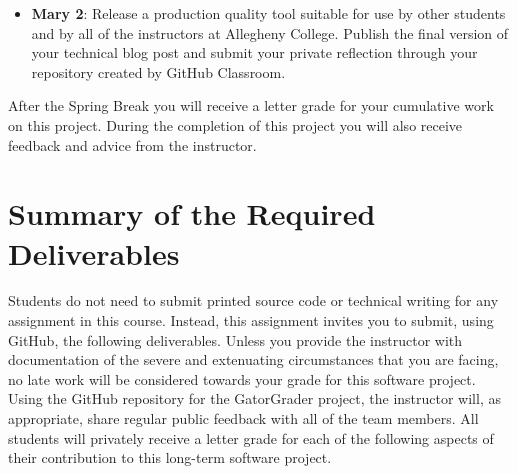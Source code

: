 \documentclass[11pt]{article}
\begin{document}
\begin{itemize}
  \item {\bf Mary 2}: Release a production quality tool suitable for use by
    other students and by all of the instructors at Allegheny College. Publish
    the final version of your technical blog post and submit your private
    reflection through your repository created by GitHub Classroom.

\end{itemize}

\noindent After the Spring Break you will receive a letter grade for your
cumulative work on this project. During the completion of this project you will
also receive feedback and advice from the instructor.


\section*{Summary of the Required Deliverables}

\noindent Students do not need to submit printed source code or technical
writing for any assignment in this course. Instead, this assignment invites you
to submit, using GitHub, the following deliverables.
%
Unless you provide the instructor with documentation of the severe and
extenuating circumstances that you are facing, no late work will be considered
towards your grade for this software project.
%
Using the GitHub repository for the GatorGrader project, the instructor will, as
appropriate, share regular public feedback with all of the team members. All
students will privately receive a letter grade for each of the following aspects
of their contribution to this long-term software project.
\end{document}
